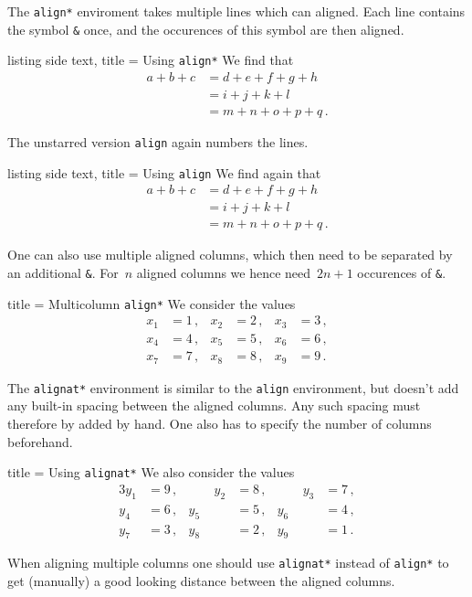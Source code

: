 \documentclass[a4paper, 10pt, headings=standardclasses, oneside, bibliography=totocnumbered]{scrbook}
\begin{document}
The \texttt{align*} enviroment takes multiple lines which can aligned.
Each line contains the symbol \texttt{\&} once, and the occurences of this symbol are then aligned.
\begin{tcblisting}{listing side text, title = {Using \texttt{align*}}}
We find that
\begin{align*}
  a + b + c
  &=
  d + e + f + g + h
  \\
  &=
  i + j + k + l
  \\
  &=
  m + n + o + p + q \,.
\end{align*}
\end{tcblisting}
The unstarred version \texttt{align} again numbers the lines.
\begin{tcblisting}{listing side text, title = {Using \texttt{align}}}
We find again that
\begin{align}
  a + b + c
  &=
  d + e + f + g + h
  \\
  &=
  i + j + k + l
  \\
  &=
  m + n + o + p + q \,.
\end{align}
\end{tcblisting}
One can also use multiple aligned columns, which then need to be separated by an additional \texttt{\&}.
For~$n$ aligned columns we hence need~$2n+1$ occurences of \texttt{\&}.
\begin{tcblisting}{title = {Multicolumn \texttt{align*}}}
We consider the values
\begin{align*}
  x_1 &= 1 \,,  &   x_2 &= 2 \,,  &   x_3 &= 3 \,,  \\
  x_4 &= 4 \,,  &   x_5 &= 5 \,,  &   x_6 &= 6 \,,  \\
  x_7 &= 7 \,,  &   x_8 &= 8 \,,  &   x_9 &= 9 \,.
\end{align*}
\end{tcblisting}

The \texttt{alignat*} environment is similar to the \texttt{align} environment, but doesn’t add any built-in spacing between the aligned columns.
Any such spacing must therefore by added by hand.
One also has to specify the number of columns beforehand.
\begin{tcblisting}{title = {Using \texttt{alignat*}}}
We also consider the values
\begin{alignat*}{3}
  y_1 &= 9 \,,  &\qquad   y_2 &= 8 \,,  &\qquad   y_3 &= 7 \,,  \\
  y_4 &= 6 \,,  &         y_5 &= 5 \,,  &         y_6 &= 4 \,,  \\
  y_7 &= 3 \,,  &         y_8 &= 2 \,,  &         y_9 &= 1 \,.
\end{alignat*}
\end{tcblisting}
When aligning multiple columns one should use \texttt{alignat*} instead of \texttt{align*} to get (manually) a good looking distance between the aligned columns.
\end{document}
